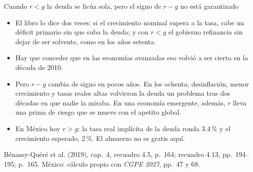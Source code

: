\documentclass[aspectratio=169,11pt]{beamer}
\newcommand{\fuente}[1]{\par\vfill{\small\color{cGris}#1\par}}
\newcommand{\BQ}{Bénassy-Quéré et al. (2019), cap.~4}
\begin{document}
\begin{frame}{Cuando $r<g$ la deuda se licúa sola, pero el signo de $r-g$ no está garantizado}
  \begin{itemize}
    \item El libro lo dice dos veces: si el crecimiento nominal supera a la tasa, cabe un déficit primario sin que suba la deuda; y con $r<g$ el gobierno refinancia sin dejar de ser solvente, como en los años setenta.
    \pause
    \item Hay que conceder que en las economías avanzadas eso volvió a ser cierto en la década de 2010.
    \pause
    \item Pero $r-g$ cambia de signo en pocos años. En los ochenta, desinflación, menor crecimiento y tasas reales altas volvieron la deuda un problema tras dos décadas en que nadie la miraba. En una economía emergente, además, $r$ lleva una prima de riesgo que se mueve con el apetito global.
    \pause
    \item En México hoy $r>g$: la tasa real implícita de la deuda ronda 3.4\,\% y el crecimiento esperado, 2\,\%. El almuerzo no es gratis aquí.
  \end{itemize}
  \fuente{\BQ, recuadro 4.5, p.~164; recuadro 4.13, pp.~194--195; p.~165. México: cálculo propio con \emph{CGPE 2027}, pp.~47 y 68.}
\end{frame}
\end{document}
